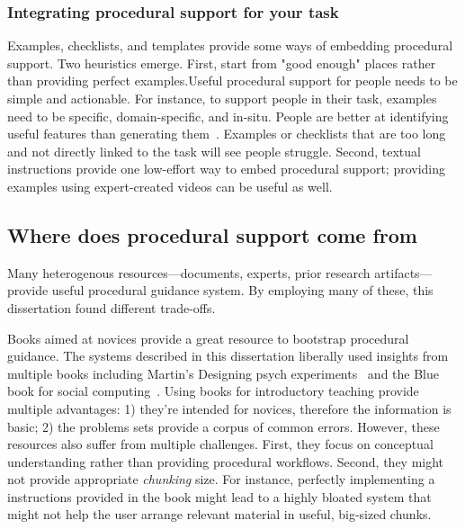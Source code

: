 \subsubsection{Integrating procedural support for your task}
Examples, checklists, and templates provide some ways of embedding procedural support. Two heuristics emerge. First, start from "good enough" places rather than providing perfect examples.Useful procedural support for people needs to be simple and actionable. For instance, to support people in their task, examples need to be specific, domain-specific, and in-situ. People are better at identifying useful features than generating them~\cite{Stahl2006}. Examples or checklists that are too long and not directly linked to the task will see people struggle. Second, textual instructions provide one low-effort way to embed procedural support; providing examples using expert-created videos can be useful as well.

\subsection{Where does procedural support come from}
Many heterogenous resources---documents, experts, prior research artifacts---provide useful procedural guidance system. By employing many of these, this dissertation found different trade-offs.

Books aimed at novices provide a great resource to bootstrap procedural guidance. The systems described in this dissertation liberally used insights from multiple books including Martin’s Designing psych experiments~\cite{Martin2007} and the Blue book for social computing~\cite{Resnick2011}. Using books for introductory teaching provide multiple advantages: 1) they're intended for novices, therefore the information is basic; 2) the problems sets provide a corpus of common errors. However, these resources also suffer from multiple challenges. First, they focus on conceptual understanding rather than providing procedural workflows. Second, they might not provide appropriate \textit{chunking} size. For instance, perfectly implementing a instructions provided in the book might lead to a highly bloated system that might not help the user arrange relevant material in useful, big-sized chunks. 

